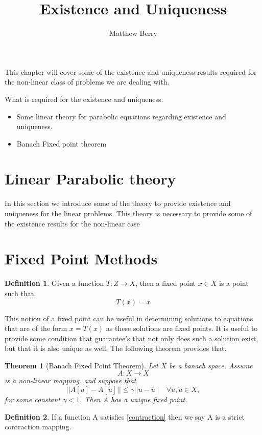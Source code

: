 \documentclass[12pt]{article}
\title{Existence and Uniqueness}
\author{Matthew Berry}
\newtheorem{theorem}{Theorem}
\theoremstyle{definition}
\newtheorem{definition}{Definition}
\begin{document}
\maketitle
This chapter will cover some of the existence and uniqueness results required for the non-linear class of problems we are dealing with.

What is required for the existence and uniqueness.
\begin{itemize}
\item Some linear theory for parabolic equations regarding existence and uniqueness.
\item Banach Fixed point theorem
\end{itemize}
\section{Linear Parabolic theory}
In this section we introduce some of the theory to provide existence and uniqueness for the linear problems. This theory is necessary to provide some of the existence results for the non-linear case  
\section{Fixed Point Methods}
\begin{definition}
Given a function $T:Z\rightarrow X$, then a fixed point $x\in X$ is a point such that, 
\begin{equation}
T(x)=x
\end{equation} 
\end{definition}
This notion of a fixed point can be useful in determining solutions to equations that are of the form $x=T(x)$ as these solutions are fixed points. It is useful to provide some condition that guarantee's that not only does such a solution exist, but that it is also unique as well. The following theorem provides that.
\begin{theorem}[Banach Fixed Point Theorem]
Let $X$ be a banach space. Assume 
\begin{equation}
A:X\rightarrow X
\end{equation}
is a non-linear mapping, and suppose that 
\begin{equation}
\lvert \lvert A[u]-A[\tilde{u}]\rvert\rvert\leq \gamma\lvert\lvert u-\tilde{u}\rvert\rvert \quad \forall u,\tilde{u}\in X,
\label{contraction}
\end{equation}
for some constant $\gamma < 1$. Then A has a unique fixed point.
\end{theorem}
\begin{definition}
If a function A satisfies \eqref{contraction} then we say A is a strict contraction mapping.
\end{definition}
\end{document}
